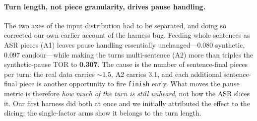 \documentclass[conference]{IEEEtran}
\begin{document}
\begin{table}[t]
\centering
\caption{Ablations on the pt-BR FDB harness. Each arm differs from its main run in
one factor. A1/A2 ablate the SFT model; A3 ablates the companion. TOR $\downarrow$
for the pause and backchannel columns, $\uparrow$ for smooth and interruption.}
\label{tab:abl}
\footnotesize
{}
\end{table}

\paragraph{Turn length, not piece granularity, drives pause handling.} The two
axes of the input distribution had to be separated, and doing so corrected our own
earlier account of the harness bug. Feeding whole sentences as ASR pieces (A1)
leaves pause handling essentially unchanged---0.080 synthetic, 0.097 candour---while
making the turns multi-sentence (A2) more than triples the synthetic-pause TOR to
\textbf{0.307}. The cause is the number of sentence-final pieces per turn: the real
data carries ${\sim}1.5$, A2 carries $3.1$, and each additional sentence-final piece
is another opportunity to fire \texttt{finish} early. What moves the pause metric
is therefore \emph{how much of the turn is still unheard}, not how the ASR slices
it. Our first harness did both at once and we initially attributed the effect to
the slicing; the single-factor arms show it belongs to the turn length.
\end{document}

